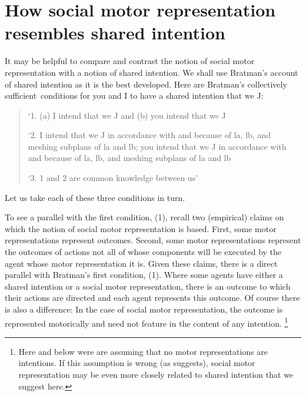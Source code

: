 \documentclass[12pt,\papersize]{extarticle}
\begin{document}
\section{How social motor representation resembles shared intention}
It may be helpful to compare and contrast the notion of social motor representation with a notion of shared intention. 
We shall use Bratman's account of shared intention as it is the best developed. 
Here are Bratman’s collectively sufficient\footnotemark \ conditions for you and I to have a shared intention that we J:
%
%
\begin{quote}
\label{quote:bratman_account}
`1. (a) I intend that we J and (b) you intend that we J
 
`2. I intend that we J in accordance with and because of la, lb, and meshing subplans of la and lb; you intend that we J in accordance with and because of la, lb, and meshing subplans of la and lb
 
`3. 1 and 2 are common knowledge between us' \citep[][p.\ View 4]{Bratman:1993je}
\end{quote}
%
Let us take each of these three conditions in turn.

To see a parallel with the first condition, (1), recall two (empirical) claims on which the notion of social motor representation is based.
First, some motor representations represent outcomes.
Second, some motor representations represent the outcomes of actions not all of whose components will be executed by the agent whose motor representation it is.
Given these claims, there is a direct parallel with Bratman's first condition, (1).
Where some agents have either a shared intention or a social motor representation, there is an outcome to which their actions are directed and each agent represents this outcome.
Of course there is also a difference: In the case of social motor representation, the outcome is represented motorically and need not feature in the content of any intention.%
\footnote{
Here and below were are assuming that no motor representations are intentions. 
If this assumption is wrong (as \citealp{pacherie:2008_action} suggests), social motor representation may be even more closely related to shared intention that we suggest here.
}
\end{document}
